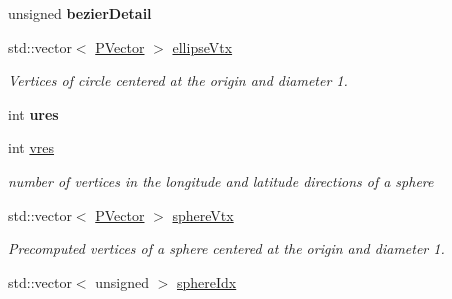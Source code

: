 \begin{DoxyCompactItemize}
\item 
\hypertarget{classcprocessing_1_1Style_af066cb110b19a792122f230f11c7cf57}{unsigned {\bfseries bezier\-Detail}}\label{classcprocessing_1_1Style_af066cb110b19a792122f230f11c7cf57}

\item 
\hypertarget{classcprocessing_1_1Style_a42743879ae50e0d629ecb1f3adfd5326}{std\-::vector$<$ \hyperlink{classcprocessing_1_1PVector}{\-P\-Vector} $>$ \hyperlink{classcprocessing_1_1Style_a42743879ae50e0d629ecb1f3adfd5326}{ellipse\-Vtx}}\label{classcprocessing_1_1Style_a42743879ae50e0d629ecb1f3adfd5326}

\begin{DoxyCompactList}\small\item\em \-Vertices of circle centered at the origin and diameter 1. \end{DoxyCompactList}\item 
\hypertarget{classcprocessing_1_1Style_a273318013798fe01a929a718089bcd41}{int {\bfseries ures}}\label{classcprocessing_1_1Style_a273318013798fe01a929a718089bcd41}

\item 
\hypertarget{classcprocessing_1_1Style_a84582322d95a21a724c07d9c4aea0ca9}{int \hyperlink{classcprocessing_1_1Style_a84582322d95a21a724c07d9c4aea0ca9}{vres}}\label{classcprocessing_1_1Style_a84582322d95a21a724c07d9c4aea0ca9}

\begin{DoxyCompactList}\small\item\em number of vertices in the longitude and latitude directions of a sphere \end{DoxyCompactList}\item 
\hypertarget{classcprocessing_1_1Style_a03aa1c2223d266bf0936c667a52c3800}{std\-::vector$<$ \hyperlink{classcprocessing_1_1PVector}{\-P\-Vector} $>$ \hyperlink{classcprocessing_1_1Style_a03aa1c2223d266bf0936c667a52c3800}{sphere\-Vtx}}\label{classcprocessing_1_1Style_a03aa1c2223d266bf0936c667a52c3800}

\begin{DoxyCompactList}\small\item\em \-Precomputed vertices of a sphere centered at the origin and diameter 1. \end{DoxyCompactList}\item 
\hypertarget{classcprocessing_1_1Style_a591c6314312702ff1ef3605fd667b37e}{std\-::vector$<$ unsigned $>$ \hyperlink{classcprocessing_1_1Style_a591c6314312702ff1ef3605fd667b37e}{sphere\-Idx}}\label{classcprocessing_1_1Style_a591c6314312702ff1ef3605fd667b37e}


\end{DoxyCompactItemize}
